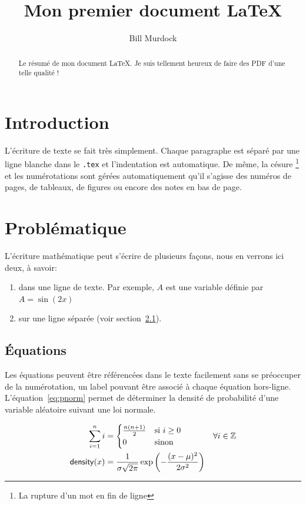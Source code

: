 \documentclass[12pt]{article} %
\author{Bill Murdock}
\title{Mon premier document \LaTeX}
\begin{document}
\maketitle

\begin{abstract}
  Le résumé de mon document \LaTeX{}. Je suis tellement heureux de faire des PDF d'une telle qualité !
\end{abstract}

\tableofcontents
\newpage

\section{Introduction}
L'écriture de texte se fait très simplement. Chaque paragraphe est séparé par une ligne blanche dans le \verb|.tex| et l'indentation est automatique. De même, la césure \footnote{La rupture d'un mot en fin de ligne} et les numérotations sont gérées automatiquement qu'il s'agisse des numéros de pages, de tableaux, de figures ou encore des notes en bas de page.

\section{Problématique}

L'écriture mathématique peut s'écrire de plusieurs façons, nous en verrons ici deux, à savoir:
\begin{enumerate}
 	\item dans une ligne de texte.
      Par exemple, $A$ est une variable définie par $A=\sin(2x)$
 	\item sur une ligne séparée (voir section~\ref{eq}).
 \end{enumerate}

\subsection{Équations}\label{eq}

Les équations peuvent être référencées dans le texte facilement sans se préoccuper de la numérotation, un label pouvant être associé à chaque équation hors-ligne.
L'équation~\eqref{eq:pnorm} permet de déterminer la densité de probabilité d'une variable aléatoire suivant une loi normale.

\begin{align}
  \notag
  \sum_{i=1}^n i & =
  \begin{cases}
    \frac{n (n+1)}{2} & \text{si } i \geq 0\\
    0 & \text{sinon}
  \end{cases} & \forall i \in \mathbb{Z}\\
  \label{eq:pnorm}
  \mathsf{density}(x) & = \frac{1}{\sigma \sqrt{2\pi}} \exp \left(-\frac{(x-\mu)^2}{2\sigma^2}\right)
\end{align}
\end{document}
